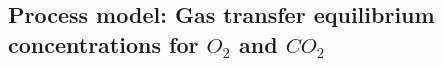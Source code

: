 \documentclass{ruthesis}
\begin{document}










\FloatBarrier
\subsection{Process model: Gas transfer equilibrium concentrations for $O_2$ and $CO_2$}


\end{document}
